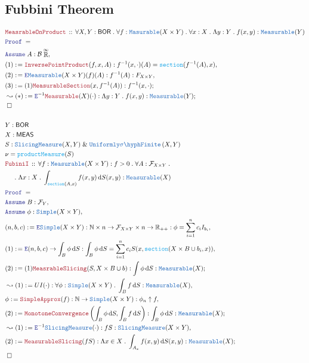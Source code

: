 \documentclass[12pt]{scrartcl}
\newcommand{\TYPE}[1]{\textcolor{NavyBlue}{\mathtt{#1}}}
\newcommand{\FUNC}[1]{\textcolor{Cerulean}{\mathtt{#1}}}
\newcommand{\LOGIC}[1]{\textcolor{Blue}{\mathtt{#1}}}
\newcommand{\THM}[1]{\textcolor{Maroon}{\mathtt{#1}}}
\renewcommand{\.}{\; . \;}
\newcommand{\de}{: \kern 0.1pc =}
\newcommand{\Theorem}[2]{& \THM{#1} \, :: \, #2 \\ & \Proof = \\ }
\newcommand{\NewLine}{\\ & \kern 1pc}
\newcommand{\Page}[1]{ \begin{align*} #1 \end{align*}   }
\renewcommand{\And}{\; \& \;}
\newcommand{\ForEach}[3]{\forall #1 : #2 \. #3 }
\newcommand{\Reals}{\mathbb{R} }
\newcommand{\Nat}{\mathbb{N} }
\newcommand{\EReals}{\stackrel{\mathclap{\infty}}{\mathbb{R}}}
\newcommand{\Say}[3]{& #1 \de #2 : #3, \\}
\newcommand{\Conclude}[3]{& #1 \de #2 : #3; \\}
\newcommand{\Derive}[3]{& \leadsto #1 \de #2 : #3, \\}
\newcommand{\DeriveConclude}[3]{& \leadsto #1 \de #2 : #3 ; \\}
\newcommand{\Assume}[2]{& \LOGIC{Assume} \; #1 : #2, \\}
\newcommand{\ByDef}{\LOGIC{E}}
\newcommand{\QED}{\; \square}
\newcommand{\EndProof}{& \QED \\}
\newcommand{\Proof}{\LOGIC{Proof} \; }
\newcommand{\B}{\mathcal{B}}
\newcommand{\BOR}{\mathsf{BOR}}
\newcommand{\SF}[1]{\TYPE{\sigma \hyph  Finite}\left( #1 \right) }
\newcommand{\F}{\mathcal{F}}
\newcommand{\MEAS}{\mathsf{MEAS}}
\begin{document}
\subsection{Fubbini Theorem }
\Page{
\Theorem{MeasrableOnProduct}{
\ForEach{X,Y}{\BOR}{
\ForEach{f}{\TYPE{Masurable}(X \times Y) }{
\ForEach{x}{X}{
\Lambda y : Y \. f(x,y) : \TYPE{Measurable}(Y)
}}}}
\Assume{A}{\B \EReals}
\Say{(1)}{ \THM{InversePointProduct}(f,x,A)}{f^{-1}(x,\cdot)(A) = \FUNC{section}(f^{-1}(  A ),x) }
\Say{(2)}{ \ByDef \TYPE{Measurable}(X \times Y)(f)(A)  }{ f^{-1}(A) : F_{X \times Y}}
\Conclude{(3)}{ (1)\THM{MeasurableSection}(x,f^{-1}(A))}{  f^{-1}(x,\cdot)   }
\DeriveConclude{(*)}{\ByDef^{-1}\THM{Measurable}(X)(\cdot)}{\Lambda y : Y \. f(x,y) : \TYPE{Measurable}(Y)}
\EndProof
\\
& Y : \BOR
\\
& X : \MEAS
\\
& S : \TYPE{SlicingMeasure}(X,Y) \And \TYPE{Uniformly}\SF{X,Y}
\\ 
& \nu = \FUNC{productMeasure}(S)
\\
\Theorem{FubiniI}{ 
\ForEach{f}{\TYPE{Measurable}(X \times Y) : f > 0}{
\ForEach{A}{\F_{X \times Y} \. \NewLine}{
\Lambda x : X \. \int_{\FUNC{section}(A,x)} f(x,y)  \, \mathrm{d} S(x, y) : \TYPE{Measurable}(X)
}}}
\Assume{B}{\F_Y}
\Assume{\phi}{\TYPE{Simple}(X \times Y)}
\Say{(n,b,c)}{\ByDef \TYPE{Simple}(X \times Y)}{ \Nat \times n \to \F_{X \times Y} \times n \to \Reals_{++} : \phi = \sum^n_{i=1}c_iI_{b_i} }
\Say{(1)}{\ByDef(n,b,c) \to \int_B \phi \, \mathrm{d}S}{\int_B \phi \, \mathrm{d}S = \sum^n_{i = 1} c_i S(x,  \FUNC{section}( X \times B \cup b_i,x)) }
\Conclude{(2)}{(1)\THM{MeasrableSlicing}(S, X \times B \cup b)}{ \int \phi \, \mathrm{d}S : \TYPE{Measurable}(X)}
\Derive{(1)}{  UI(\cdot)}{\forall \phi : \TYPE{Simple}(X \times Y) \. \int_B f \,  \mathrm{d}S : \TYPE{Measurable}(X)}
\Say{\phi}{ \THM{SimpleApprox}(f) }{ \Nat \to \TYPE{Simple}(X \times Y) : \phi_n \uparrow f   }
\Conclude{(2)}{ \THM{MonotoneConvergence} \left( \int_B \phi \, \mathrm{d} S , \int_B f \, \mathrm{d} S \right)}{ \int_B \phi \, \mathrm{d} S : \TYPE{Measurable}(X)}
\Derive{(1)}{ \ByDef^{-1}\TYPE{SlicingMeasure}(\cdot) }{ fS : \TYPE{SlicingMeasure}(X \times Y) }
\Conclude{(2)}{\THM{MeasurableSlicing}(fS)}{ \Lambda x \in X \. \int_{A_x} f(x,y) \, \mathrm{d}S(x, y) : \TYPE{Measurable}(X) }
\EndProof
}
\newpage
\end{document}
